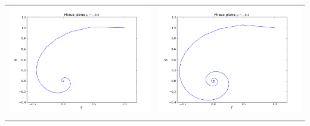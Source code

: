 \begin{table}[ht]
\centering
\begin{tabular}{cc}
\includegraphics[scale=0.3]{phase_hopf08m}&\includegraphics[scale=0.3]{phase_hopf04m}\\
\newline

\end{tabular}
\end{table}
